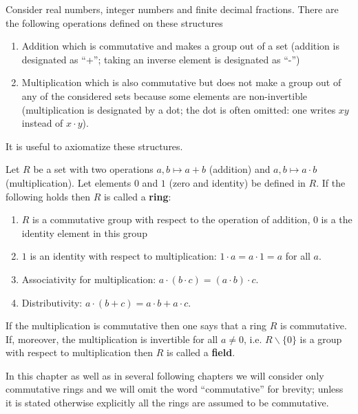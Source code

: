 \documentclass[12pt]{article}
\begin{document}

Consider real numbers, integer numbers and finite decimal
fractions. There are the following operations defined on these structures
\begin{enumerate}
\item Addition which is commutative and makes a group out of a set
  (addition is designated as ``+''; taking an inverse element is
  designated as ``-'')

\item Multiplication which is also commutative but does not make a
  group out of any of the considered sets because some elements are
  non-invertible (multiplication is designated by a dot; the dot is
  often omitted: one writes $xy$ instead of $x\cdot y$).
\end{enumerate}
It is useful to axiomatize these structures.

\begin{opredelenie} 
Let $R$ be a set with two operations $a, b \mapsto a+b$
(addition) and $a, b \mapsto a\cdot b$ (multiplication). Let elements
$0$ and $1$ (zero and identity) be defined in $R$. If the following
holds then $R$ is called a {\bf ring}:
\begin{enumerate}
\item $R$ is a commutative group with respect to the operation of
  addition, $0$ is a the identity element in this group

\item $1$ is an identity with respect to multiplication: $1 \cdot a = a
\cdot 1 =a$ for all $a$.

\item Associativity for multiplication: $a \cdot (b \cdot c) = (a \cdot
  b) \cdot c$.

\item Distributivity: $a\cdot (b+c) = a \cdot b + a\cdot c$.
\end{enumerate}
If the multiplication is commutative then one says that a ring $R$ is
commutative. If, moreover, the multiplication is invertible for all
$a\neq 0$, i.e. $R \backslash \{0\}$ is a group with respect to
multiplication then $R$ is called a {\bf field}.
\end{opredelenie}

In this chapter as well as in several following chapters we will
consider only commutative rings and we will omit the word
``commutative'' for brevity; unless it is stated otherwise explicitly
all the rings are assumed to be commutative.
\end{document}
